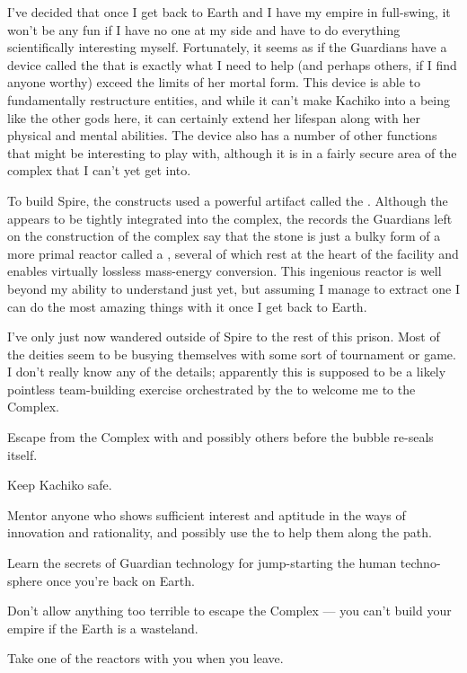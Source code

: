 \documentclass[char]{guardians}
\begin{document}
I've decided that once I get back to Earth and I have my empire in full-swing, it won't be any fun if I have no one at my side and have to do everything scientifically interesting myself. Fortunately, it seems as if the Guardians have a device called the \assembler{} that is exactly what I need to help \cKachiko{} (and perhaps others, if I find anyone worthy) exceed the limits of her mortal form. This device is able to fundamentally restructure entities, and while it can't make Kachiko into a being like the other gods here, it can certainly extend her lifespan along with her physical and mental abilities. The device also has a number of other functions that might be interesting to play with, although it is in a fairly secure area of the complex that I can't yet get into.

To build Spire, the constructs used a powerful artifact called the \stone{}. Although the \stone{} appears to be tightly integrated into the complex, the records the Guardians left on the construction of the complex say that the stone is just a bulky form of a more primal reactor called a \core{}, several of which rest at the heart of the facility and enables virtually lossless mass-energy conversion. This ingenious reactor is well beyond my ability to understand just yet, but assuming I manage to extract one I can do the most amazing things with it once I get back to Earth.

I've only just now wandered outside of Spire to the rest of this prison. Most of the deities seem to be busying themselves with some sort of tournament or game. I don't really know any of the details; apparently this is supposed to be a likely pointless team-building exercise orchestrated by the \cCaretaker{} to welcome me to the Complex.




\begin{itemz}[Goals]
  \item Escape from the Complex with \cKachiko{} and possibly others before the bubble re-seals itself.
  \item Keep Kachiko safe.
  \item Mentor anyone who shows sufficient interest and aptitude in the ways of innovation and rationality, and possibly use the \assembler{} to help them along the path.
  \item Learn the secrets of Guardian technology for jump-starting the human techno-sphere once you're back on Earth.
  \item Don't allow anything too terrible to escape the Complex --- you can't build your empire if the Earth is a wasteland.
  \item Take one of the \core{} reactors with you when you leave.
\end{itemz}
\end{document}
